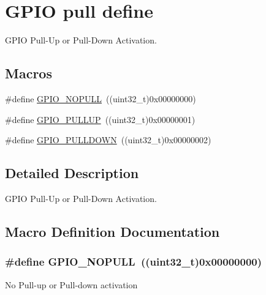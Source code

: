 \hypertarget{group___g_p_i_o__pull__define}{}\section{G\+P\+IO pull define}
\label{group___g_p_i_o__pull__define}


G\+P\+IO Pull-\/\+Up or Pull-\/\+Down Activation.  


\subsection*{Macros}
\begin{DoxyCompactItemize}
\item 
\#define \hyperlink{group___g_p_i_o__pull__define_ga5c2862579882c1cc64e36d38fbd07a4c}{G\+P\+I\+O\+\_\+\+N\+O\+P\+U\+LL}~((uint32\+\_\+t)0x00000000)
\item 
\#define \hyperlink{group___g_p_i_o__pull__define_gae689bc8f5c42d6df7bd54a8dd372e072}{G\+P\+I\+O\+\_\+\+P\+U\+L\+L\+UP}~((uint32\+\_\+t)0x00000001)
\item 
\#define \hyperlink{group___g_p_i_o__pull__define_ga75d958d0410c36da7f27d1f4f5c36c14}{G\+P\+I\+O\+\_\+\+P\+U\+L\+L\+D\+O\+WN}~((uint32\+\_\+t)0x00000002)
\end{DoxyCompactItemize}


\subsection{Detailed Description}
G\+P\+IO Pull-\/\+Up or Pull-\/\+Down Activation. 



\subsection{Macro Definition Documentation}
\subsubsection[{\texorpdfstring{G\+P\+I\+O\+\_\+\+N\+O\+P\+U\+LL}{GPIO_NOPULL}}]{\setlength{\rightskip}{0pt plus 5cm}\#define G\+P\+I\+O\+\_\+\+N\+O\+P\+U\+LL~((uint32\+\_\+t)0x00000000)}\hypertarget{group___g_p_i_o__pull__define_ga5c2862579882c1cc64e36d38fbd07a4c}{}\label{group___g_p_i_o__pull__define_ga5c2862579882c1cc64e36d38fbd07a4c}
No Pull-\/up or Pull-\/down activation 

